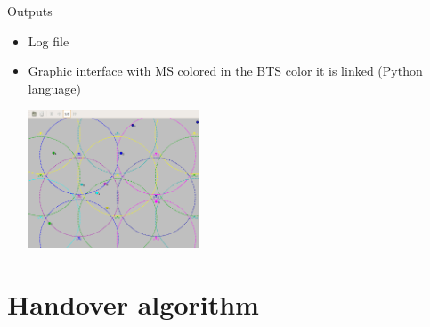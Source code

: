 \documentclass{beamer}
\begin{document}
\begin{frame}
Outputs\\

\begin{itemize}
    \item Log file
    \item Graphic interface with MS colored in the BTS color it is linked
(Python language)
      \begin{center}
        \includegraphics[width=0.4\textwidth]{./images/capture.png}
      \end{center}
\end{itemize}

\end{frame}

\section{Handover algorithm}
\end{document}
